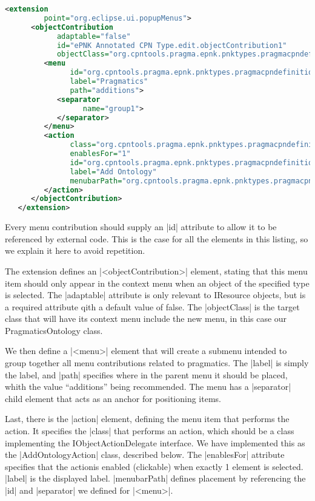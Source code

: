 \begin{lstlisting}[language=XML,float,label=lst:addOntologyMenu,
caption=Add Ontology Menu Extension]
   <extension
         point="org.eclipse.ui.popupMenus">
      <objectContribution
            adaptable="false"
            id="ePNK Annotated CPN Type.edit.objectContribution1"
            objectClass="org.cpntools.pragma.epnk.pnktypes.pragmacpndefinition.PragmaticsOntology">
         <menu
               id="org.cpntools.pragma.epnk.pnktypes.pragmacpndefinition.actions.standardmenu"
               label="Pragmatics"
               path="additions">
            <separator
                  name="group1">
            </separator>
         </menu>
         <action
               class="org.cpntools.pragma.epnk.pnktypes.pragmacpndefinition.menu.AddOntologyAction"
               enablesFor="1"
               id="org.cpntools.pragma.epnk.pnktypes.pragmacpndefinition.actions.AddOntologyAction"
               label="Add Ontology"
               menubarPath="org.cpntools.pragma.epnk.pnktypes.pragmacpndefinition.actions.standardmenu/group1">
         </action>
      </objectContribution>
   </extension>
\end{lstlisting}

Every menu contribution should supply an |id| attribute to allow it to be
referenced by external code. This is the case for all the elements in this
listing, so we explain it here to avoid repetition.

The extension defines an
|<objectContribution>| element, stating that this menu item should only appear
in the context menu when an object of the specified type is selected. The
|adaptable| attribute is only relevant to IResource objects, but is a required
attribute qith a default value of false. The |objectClass| is the
target class that will have its context menu include the new menu, in this case
our PragmaticsOntology class.

We then define a |<menu>| element that will create a submenu intended to group
together all menu contributions related to pragmatics. The |label| is simply
the label, and |path| specifies where in the parent menu it should be
placed, whith the value ``additions'' being recommended. The menu has a
|separator| child element that acts as an anchor for positioning items. 

Last, there is the |action| element, defining the menu item that performs the
action. It specifies the |class| that performs an action, which should be a
class implementing the IObjectActionDelegate interface. We have implemented this
as the |AddOntologyAction| class, described below. The |enablesFor| attribute
specifies that the actionis enabled (clickable) when exactly 1 element is
selected. |label| is the displayed label. |menubarPath| defines
placement by referencing the |id| and |separator| we defined for |<menu>|.

